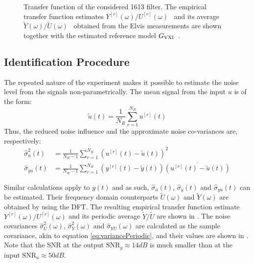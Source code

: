 \begin{figure}
  \centering
  \setlength{\figurewidth}{0.75\columnwidth}
  \setlength{\figureheight}{0.68\figurewidth}
  
  \caption[\BK{} 1613 filter transfer function]{Transfer function of the considered \BK{} 1613 filter.
  The empirical transfer function estimates $Y^{[r]}(\omega)/U^{[r]}(\omega)$~ and its average $\tilde{Y}(\omega)/\tilde{U}(\omega)$~ obtained from the Elvis measurements are shown together with the estimated reference model $G_{\mathrm{VXI}}$~.} 
  \label{fig:bk1613}
\end{figure}


\subsection{Identification Procedure}
The repeated nature of the experiment makes it possible to estimate the noise level from the signals non-parametrically.
The mean signal from the input $u$ is of the form:
\begin{equation}
  \tilde{u}(t) = \frac{1}{N_R} \sum_{r=1}^{N_R} u^{[r]}(t)
\end{equation}
Thus, the reduced noise influence and the approximate noise co-variances are, respectively:
\begin{align}
  \hat\sigma_{u}^2(t) &= \frac{1}{N_R - 1} 
                    \sum_{r=1}^{N_R} 
                    \left( u^{[r]}(t) - \tilde{u}(t) \right)^2 \\
  \hat\sigma_{yu}(t) &= \frac{1}{N_R - 1} 
                    \sum_{r=1}^{N_R} 
                    \left( y^{[r]}(t) - \tilde{y}(t) \right)
                    \overline{\left( u^{[r]}(t) - \tilde{u}(t) \right)}
  \label{eq:variancePeriodic}            
\end{align}
 
Similar calculations apply to $y(t)$ and as such, $\hat\sigma_u(t)$, $\hat\sigma_y(t)$ and $\hat\sigma_{yu}(t)$ can be estimated.
Their frequency domain counterparts $\tilde{U}(\omega)$ and $\tilde{Y}(\omega)$ are obtained by using the DFT.
The resulting empirical transfer function estimate $Y^{[r]}(\omega)/U^{[r]}(\omega)$ and its periodic average $\tilde{Y}/\tilde{U}$ are shown in .
The noise covariances $\hat\sigma^2_{U}(\omega)$, $\hat\sigma^2_{Y}(\omega)$ and  $\hat\sigma_{YU}(\omega)$ are calculated as the sample covariance, akin to equation \eqref{eq:variancePeriodic}, and their values are shown in .
Note that the SNR at the output $\mathrm{SNR}_{y} \approx 14 \unit{dB}$ is much smaller than at the input $\mathrm{SNR}_{u} \approx 50 \unit{dB}$.

